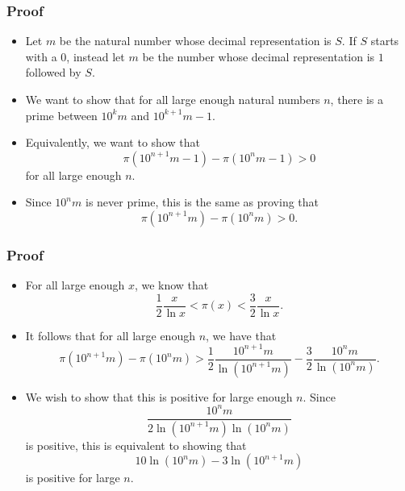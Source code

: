 \documentclass{beamer}
\begin{document}
\begin{frame}
    \frametitle{Proof}

    \begin{itemize}
        \item Let $m$ be the natural number whose decimal representation is $S$. If $S$ starts with a $0$, instead let $m$ be the number whose decimal representation is $1$ followed by $S$. \pause
        \item We want to show that for all large enough natural numbers $n$, there is a prime between $10^k m$ and $10^{k + 1} m - 1$. \pause
        \item Equivalently, we want to show that
        \[
            \pi\left( 10^{n + 1} m - 1\right) - \pi\left( 10^n m - 1 \right) > 0
        \]
        for all large enough $n$. \pause
        \item Since $10^n m$ is never prime, this is the same as proving that
        \[
            \pi\left( 10^{n + 1} m \right) - \pi\left( 10^n m \right) > 0.
        \]
    \end{itemize}    

\end{frame}

\begin{frame}
    \frametitle{Proof}

    \begin{itemize}
        \item For all large enough $x$, we know that
        \[
            \frac{1}{2} \frac{x}{\ln x} < \pi(x) < \frac{3}{2} \frac{x}{\ln x}.
        \]
        \pause
        \item It follows that for all large enough $n$, we have that
        \[
            \pi\left( 10^{n + 1} m \right) - \pi\left( 10^n m \right) > \frac{1}{2} \frac{10^{n + 1} m}{\ln\left( 10^{n + 1} m \right)} - \frac{3}{2} \frac{10^n m}{\ln\left( 10^n m \right)}.
        \]
        \pause
        \item We wish to show that this is positive for large enough $n$. Since
        \[
            \frac{10^n m}{2 \ln\left( 10^{n + 1} m \right) \ln\left( 10^n m \right)}    
        \]
        is positive, this is equivalent to showing that
        \[
            10 \ln\left( 10^n m \right) - 3 \ln\left( 10^{n + 1} m \right)    
        \]
        is positive for large $n$.
    \end{itemize} 

\end{frame}
\end{document}
